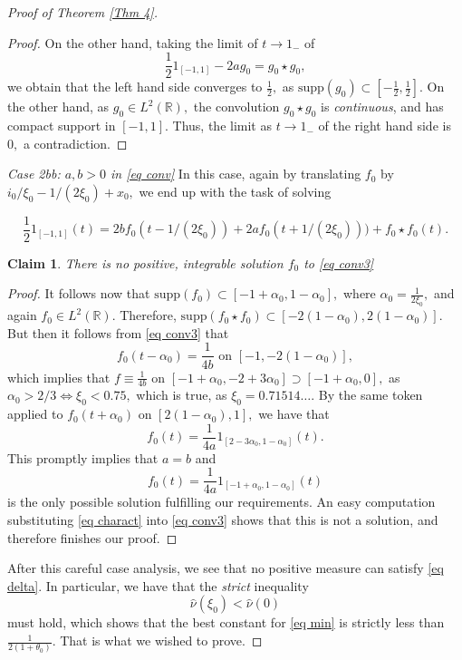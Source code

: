 \documentclass[11pt, reqno]{amsart}
\newcommand{\s}{\star}
\numberwithin{equation}{section}
\newtheorem{claim}[theorem]{Claim}
\newcommand{\R}{{\mathbb R}}
\begin{document}
\begin{proof}[Proof of Theorem \ref{Thm 4}]
\begin{proof}
On the other hand, taking the limit of $t \to 1_{-}$ of 
\begin{equation}\label{eq conv21}
\frac{1}{2}1_{[-1,1]} - 2a g_0 = g_0 \s g_0,
\end{equation}
we obtain that the left hand side converges to $\frac{1}{2},$ as $\text{supp}(g_0) \subset [-\frac{1}{2},\frac{1}{2}].$ On the other hand, as $g_0 \in L^2(\R),$ the convolution 
$g_0 \s g_0$ is \emph{continuous}, and has compact support in $[-1,1].$ Thus, the limit as $t \to 1_{-}$ of the right hand side is $0,$ a contradiction. 
\end{proof}

\noindent\textit{Case 2bb: $a, b > 0$ in \eqref{eq conv}} In this case, again by translating $f_0$ by $i_0/\xi_0 - 1/(2\xi_0) + x_0,$ we end up with the task of solving 

\begin{equation}\label{eq conv3}
\frac{1}{2} 1_{[-1,1]}(t) = 2bf_0(t-1/(2\xi_0)) + 2af_0(t+1/(2\xi_0))) + f_0 \s f_0(t).
\end{equation}

\begin{claim} There is no positive, integrable solution $f_0$ to \eqref{eq conv3} 
\end{claim}

\begin{proof} It follows now that $\text{supp}(f_0) \subset [-1+\alpha_0,1-\alpha_0],$ where $\alpha_0 = \frac{1}{2\xi_0},$ 
and again $f_0 \in L^2(\R).$ Therefore, $\text{supp}(f_0 \s f_0) \subset [-2(1-\alpha_0),2(1-\alpha_0)].$ But then it follows from \eqref{eq conv3} that 
\[
f_0(t-\alpha_0) = \frac{1}{4b} \text{ on } [-1,-2(1-\alpha_0)],
\]
which implies that $f \equiv \frac{1}{4b}$ on $[-1+\alpha_0, -2+3\alpha_0] \supset [-1+\alpha_0,0],$ as $\alpha_0 > 2/3 \iff \xi_0 < 0.75,$ which is true, as $\xi_0 = 0.71514\dots.$ By the same token applied 
to $f_0(t+\alpha_0)$ on $[2(1-\alpha_0),1],$ we have that
\[
f_0(t) = \frac{1}{4a}1_{[2-3\alpha_0,1-\alpha_0]}(t).
\]
This promptly implies that $a = b$ and 
\begin{equation}\label{eq charact}
f_0(t) = \frac{1}{4a} 1_{[-1+\alpha_0,1-\alpha_0]}(t)
\end{equation}
is the only possible solution fulfilling our requirements. An easy computation substituting \eqref{eq charact} into \eqref{eq conv3} shows that this is not a solution, and therefore finishes our proof.
\end{proof}

After this careful case analysis, we see that no positive measure can satisfy \eqref{eq delta}. In particular, we have that the \emph{strict} inequality 
\[
\widehat{\nu}(\xi_0) < \widehat{\nu}(0)
\]
must hold, which shows that the best constant for \eqref{eq min} is strictly less than $\frac{1}{2(1+\theta_0)}.$ That is what we wished to prove. 
\end{proof} 
\end{document}
